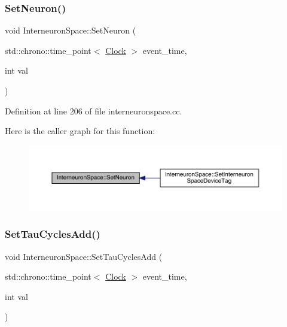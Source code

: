 \subsubsection{\texorpdfstring{Set\+Neuron()}{SetNeuron()}}
{\footnotesize\ttfamily void Interneuron\+Space\+::\+Set\+Neuron (\begin{DoxyParamCaption}\item[{std\+::chrono\+::time\+\_\+point$<$ \hyperlink{universe_8h_a0ef8d951d1ca5ab3cfaf7ab4c7a6fd80}{Clock} $>$}]{event\+\_\+time,  }\item[{int}]{val }\end{DoxyParamCaption})}



Definition at line 206 of file interneuronspace.\+cc.

Here is the caller graph for this function\+:
\nopagebreak
\begin{figure}[H]
\begin{center}
\leavevmode
\includegraphics[width=350pt]{class_interneuron_space_a50aaa97f71011dafb583dc432817f477_icgraph}
\end{center}
\end{figure}
\mbox{\label{class_interneuron_space_ad6c1387daa261a3e8e1dba1402101d5c}} 
\subsubsection{\texorpdfstring{Set\+Tau\+Cycles\+Add()}{SetTauCyclesAdd()}}
{\footnotesize\ttfamily void Interneuron\+Space\+::\+Set\+Tau\+Cycles\+Add (\begin{DoxyParamCaption}\item[{std\+::chrono\+::time\+\_\+point$<$ \hyperlink{universe_8h_a0ef8d951d1ca5ab3cfaf7ab4c7a6fd80}{Clock} $>$}]{event\+\_\+time,  }\item[{int}]{val }\end{DoxyParamCaption})\hspace{0.3cm}{\ttfamily [inline]}}



